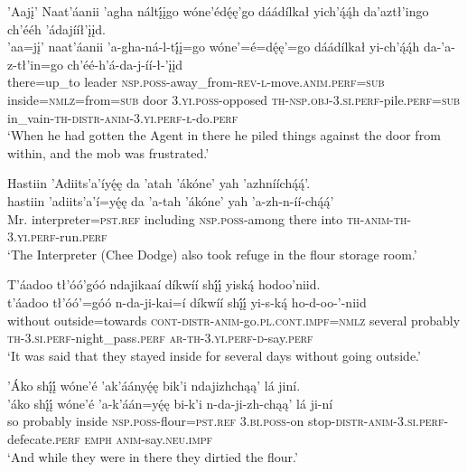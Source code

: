 \ea\label{ex:text3-4-8}
’Aajį’ Naat’áanii ’agha náltį́įgo wóne’édę́ę’go dáádílkał yich’ą́ą́h da’aztł’ingo ch’ééh ’ádajííł’įįd.\\
\gll ’aa=jį’	naat’áanii	’a-gha-ná-l-tį́į=go	wóne’=é=dę́ę’=go	dáádílkał	yi-ch’ą́ą́h	da-’a-z-tł’in=go	ch’éé-h’á-da-j-íí-ł-’įįd\\
     there=up\_to	leader	\textsc{nsp}.\textsc{poss}-away\_from-\textsc{rev}-\textsc{l}-move.\textsc{anim}.\textsc{perf}=\textsc{sub}	inside=\textsc{nmlz}=from=\textsc{sub}	door	3.\textsc{yi}.\textsc{poss}-opposed	\textsc{th}-\textsc{nsp}.\textsc{obj}-3.\textsc{si}.\textsc{perf}-pile.\textsc{perf}=\textsc{sub}	in\_vain-\textsc{th}-\textsc{distr}-\textsc{anim}-3.\textsc{yi}.\textsc{perf}-\textsc{ł}-do.\textsc{perf}\\
\glt `When he had gotten the Agent in there he piled things against the door from within, and the mob was frustrated.'
\z

\ea\label{ex:text3-4-9}
Hastiin ’Adiits’a’íyę́ę da ’atah ’ákóne’ yah ’azhnííchą́ą́’.\\
\gll hastiin	’adiits’a’í=yę́ę	da	’a-tah	’ákóne’	yah	’a-zh-n-íí-chą́ą́’\\
     Mr.	interpreter=\textsc{pst}.\textsc{ref}	including	\textsc{nsp}.\textsc{poss}-among	there	into	\textsc{th}-\textsc{anim}-\textsc{th}-3.\textsc{yi}.\textsc{perf}-run.\textsc{perf}\\
\glt `The Interpreter (Chee Dodge) also took refuge in the flour storage room.'
\z

\ea\label{ex:text3-4-10}
T’áadoo tł’óó’góó ndajikaaí díkwíí shį́į́ yiską́ hodoo’niid.\\
\gll t’áadoo	tł’óó’=góó	n-da-ji-kai=í	díkwíí	shį́į́	yi-s-ką́	ho-d-oo-’-niid\\
     without	outside=towards	\textsc{cont}-\textsc{distr}-\textsc{anim}-go.\textsc{pl}.\textsc{cont}.\textsc{impf}=\textsc{nmlz}	several	probably	\textsc{th}-3.\textsc{si}.\textsc{perf}-night\_pass.\textsc{perf}	\textsc{ar}-\textsc{th}-3.\textsc{yi}.\textsc{perf}-\textsc{d}-say.\textsc{perf}\\
\glt `It was said that they stayed inside for several days without going outside.'
\z

\ea\label{ex:text3-4-11}
’Áko shį́į́ wóne’é ’ak’áányę́ę bik’i ndajizhchąą’ lá jiní.\\
\gll ’áko	shį́į́	wóne’é	’a-k’áán=yę́ę	bi-k’i	n-da-ji-zh-chąą’	lá	ji-ní\\
     so	probably	inside	\textsc{nsp}.\textsc{poss}-flour=\textsc{pst}.\textsc{ref}	3.\textsc{bi}.\textsc{poss}-on	stop-\textsc{distr}-\textsc{anim}-3.\textsc{si}.\textsc{perf}-defecate.\textsc{perf}	\textsc{emph}	\textsc{anim}-say.\textsc{neu}.\textsc{impf}\\
\glt `And while they were in there they dirtied the flour.'
\z

